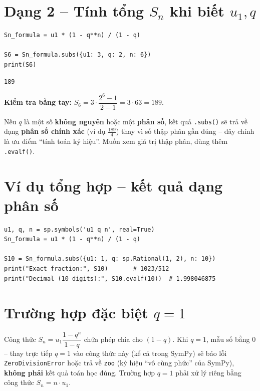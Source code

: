 \documentclass[12pt,a4paper]{report}
\begin{document}
\section{Dạng 2 -- Tính tổng $S_n$ khi biết $u_1, q$}

\begin{lstlisting}[caption={Ví dụ 3: Tính $S_6$ khi $u_1 = 3, q = 2$}]
Sn_formula = u1 * (1 - q**n) / (1 - q)

S6 = Sn_formula.subs({u1: 3, q: 2, n: 6})
print(S6)
\end{lstlisting}

\begin{lstlisting}[style=outstyle,numbers=none]
189
\end{lstlisting}

\noindent\textbf{Kiểm tra bằng tay:}
$S_6 = 3 \cdot \dfrac{2^6 - 1}{2 - 1} = 3 \cdot 63 = 189$.

\begin{warnbox}
Nếu $q$ là một số \textbf{không nguyên} hoặc một \textbf{phân số}, kết
quả \texttt{.subs()} sẽ trả về dạng \textbf{phân số chính xác} (ví dụ
$\frac{189}{4}$) thay vì số thập phân gần đúng -- đây chính là ưu điểm
``tính toán ký hiệu''. Muốn xem giá trị thập phân, dùng thêm
\texttt{.evalf()}.
\end{warnbox}

\section{Ví dụ tổng hợp -- kết quả dạng phân số}

\begin{lstlisting}[caption={Tính $S_{10}$ khi $u_1 = 1, q = 1/2$}]
u1, q, n = sp.symbols('u1 q n', real=True)
Sn_formula = u1 * (1 - q**n) / (1 - q)

S10 = Sn_formula.subs({u1: 1, q: sp.Rational(1, 2), n: 10})
print("Exact fraction:", S10)       # 1023/512
print("Decimal (10 digits):", S10.evalf(10))  # 1.998046875
\end{lstlisting}

\section{Trường hợp đặc biệt $q = 1$}

\begin{warnbox}
Công thức $S_n = u_1 \dfrac{1-q^n}{1-q}$ chứa phép chia cho $(1 - q)$.
Khi $q = 1$, mẫu số bằng 0 -- thay trực tiếp $q=1$ vào công thức này
(kể cả trong SymPy) sẽ báo lỗi \texttt{ZeroDivisionError} hoặc trả về
\texttt{zoo} (ký hiệu ``vô cùng phức'' của SymPy), \textbf{không phải}
kết quả toán học đúng. Trường hợp $q = 1$ phải xử lý riêng bằng công
thức $S_n = n \cdot u_1$.
\end{warnbox}
\end{document}
